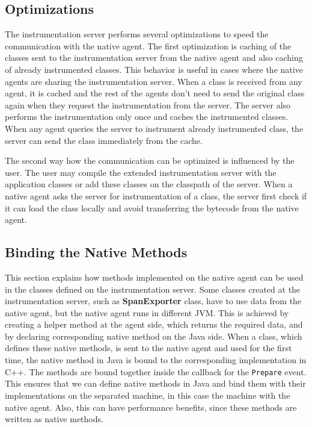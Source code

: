 \subsection{Optimizations}
The instrumentation server performs several optimizations to speed the communication with the native agent. The first optimization is caching of the classes sent to the instrumentation server from the native agent and also caching of already instrumented classes. This behavior is useful in cases where the native agents are sharing the instrumentation server. When a class is received from any agent, it is cached and the rest of the agents don't need to send the original class again when they request the instrumentation from the server. The server also performs the instrumentation only once and caches the instrumented classes. When any agent queries the server to instrument already instrumented class, the server can send the class immediately from the cache.

The second way how the communication can be optimized is influenced by the user. The user may compile the extended instrumentation server with the application classes or add these classes on the classpath of the server. When a native agent asks the server for instrumentation of a class, the server first check if it can load the class locally and avoid transferring the bytecode from the native agent. 

\subsection{Binding the Native Methods}
This section explains how methods implemented on the native agent can  be used in the classes defined on the instrumentation server. Some classes created at the instrumentation server, such as \textbf{SpanExporter} class, have to use data from the native agent, but the native agent runs in different JVM. This is achieved by creating a helper method at the agent side, which returns the required data, and by declaring corresponding native method on the Java side. When a class, which defines these native methods, is sent to the native agent and used for the first time, the native method in Java is bound to the corresponding implementation in C++. The methods are bound together inside the callback for the \texttt{Prepare} event. This ensures that we can define native methods in Java and bind them with their implementations on the separated machine, in this case the machine with the native agent. Also, this can have performance benefits, since these methods are written as native methods.

